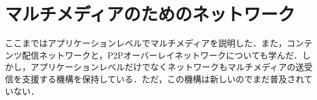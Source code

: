 \section{マルチメディアのためのネットワーク}
ここまではアプリケーションレベルでマルチメディアを説明した．また，コンテンツ配信ネットワークと，P2Pオーバーレイネットワークについても学んだ．しかし，アプリケーションレベルだけでなくネットワークもマルチメディアの送受信を支援する機構を保持している．ただ，この機構は新しいのでまだ普及されていない．


